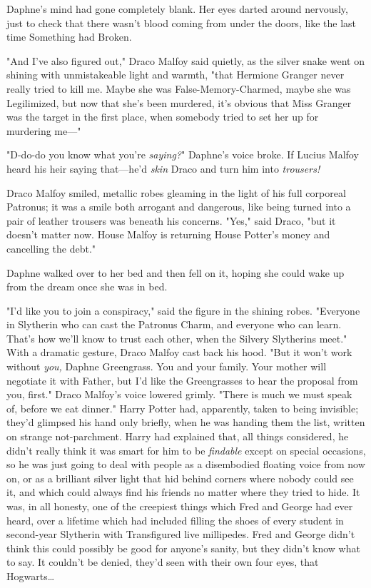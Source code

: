 Daphne's mind had gone completely blank. Her eyes darted around nervously, just
to check that there wasn't blood coming from under the doors, like the last
time Something had Broken.

"And I've also figured out," Draco Malfoy said quietly, as the silver snake
went on shining with unmistakeable light and warmth, "that Hermione Granger
never really tried to kill me. Maybe she was False-Memory-Charmed, maybe she
was Legilimized, but now that she's been murdered, it's obvious that Miss
Granger was the target in the first place, when somebody tried to set her up
for murdering me---"

"D-do-do you know what you're \emph{saying?}" Daphne's voice broke. If Lucius
Malfoy heard his heir saying that---he'd \emph{skin} Draco and turn him into
\emph{trousers!}

Draco Malfoy smiled, metallic robes gleaming in the light of his full corporeal
Patronus; it was a smile both arrogant and dangerous, like being turned into a
pair of leather trousers was beneath his concerns. "Yes," said Draco, "but it
doesn't matter now. House Malfoy is returning House Potter's money and
cancelling the debt."

Daphne walked over to her bed and then fell on it, hoping she could wake up
from the dream once she was in bed.

"I'd like you to join a conspiracy," said the figure in the shining robes.
"Everyone in Slytherin who can cast the Patronus Charm, and everyone who can
learn. That's how we'll know to trust each other, when the Silvery Slytherins
meet." With a dramatic gesture, Draco Malfoy cast back his hood. "But it won't
work without \emph{you,} Daphne Greengrass. You and your family. Your mother
will negotiate it with Father, but I'd like the Greengrasses to hear the
proposal from you, first." Draco Malfoy's voice lowered grimly. "There is much
we must speak of, before we eat dinner."
\later
Harry Potter had, apparently, taken to being invisible; they'd glimpsed his
hand only briefly, when he was handing them the list, written on strange
not-parchment. Harry had explained that, all things considered, he didn't
really think it was smart for him to be \emph{findable} except on special
occasions, so he was just going to deal with people as a disembodied floating
voice from now on, or as a brilliant silver light that hid behind corners where
nobody could see it, and which could always find his friends no matter where
they tried to hide. It was, in all honesty, one of the creepiest things which
Fred and George had ever heard, over a lifetime which had included filling the
shoes of every student in second-year Slytherin with Transfigured live
millipedes. Fred and George didn't think this could possibly be good for
anyone's sanity, but they didn't know what to say. It couldn't be denied,
they'd seen with their own four eyes, that Hogwarts{\ldots}

